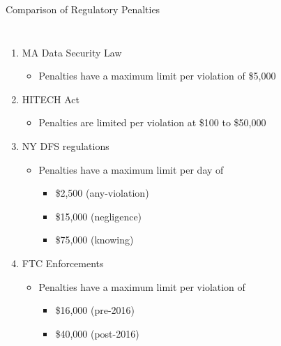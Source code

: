 \documentclass[10pt]{beamer}
\begin{document}
\begin{frame}{Comparison of Regulatory Penalties}
\begin{columns}
    \begin{enumerate}
      \item MA Data Security Law
            \begin{itemize}
                \item Penalties have a maximum limit per violation of \$5,000 \\
            \end{itemize}
      \item HITECH Act
            \begin{itemize}
                \item Penalties are limited per violation at \$100 to \$50,000 \\
            \end{itemize}
      \item NY DFS regulations
          \begin{itemize}
                \item Penalties have a maximum limit per day of
                \begin{itemize}
                    \item \$2,500 (any-violation) \\
                    \item \$15,000 (negligence)\\
                    \item \$75,000 (knowing) \\
                \end{itemize}
          \end{itemize}
      \item FTC Enforcements
          \begin{itemize}
                \item Penalties have a maximum limit per violation of
                \begin{itemize}
                    \item \$16,000 (pre-2016) \\
                    \item \$40,000 (post-2016) \\
                \end{itemize}
          \end{itemize}          
    \end{enumerate}

\end{columns}
\end{frame}
\end{document}
